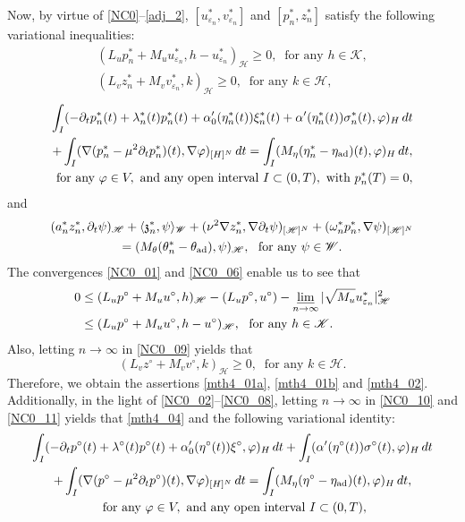 \documentclass{sinst}
\numberwithin{equation}{section}
\theoremstyle{plain}
\theoremstyle{definition}
\def\sH{\mathscr{H}}
\def\sK{\mathscr{K}}
\def\sW{\mathscr{W}}
\def\ad{{\rm ad}}
\begin{document}
Now, by virtue of \eqref{NC0}--\eqref{adj_2}, $[u_{\varepsilon_n}^*, v_{\varepsilon_n}^*]$ and $[p_n^*, z_n^*]$ satisfy the following variational inequalities:
\begin{gather}
  (L_u p_n^* + M_u u_{\varepsilon_n}^*, h - u_{\varepsilon_n}^*)_\sH \geq 0, \ \mbox{ for any } h \in \sK, \label{NC0_091}
  \\
  (L_v z_n^* + M_v v_{\varepsilon_n}^*, k)_\sH \geq 0, \ \mbox{ for any } k \in \sH, \label{NC0_09}
\end{gather}
\begin{gather}
  \int_I (-\partial_t p_n^*(t) + \lambda_n^*(t) p_n^*(t) + \alpha_0'(\eta_n^*(t)) \xi_n^*(t) + \alpha'(\eta_n^*(t)) \sigma_n^*(t), \varphi)_H \,dt
  \\
  + \int_I (\nabla (p_n^* - \mu^2 \partial_t p_n^*)(t), \nabla \varphi)_{[H]^N} \,dt = \int_I (M_\eta (\eta_n^* - \eta_\ad)(t), \varphi)_H \,dt, \label{NC0_10}
  \\
  \mbox{ for any } \varphi \in V, \mbox{ and any open interval } I \subset (0,T), \mbox{ with } p_n^*(T) = 0,
\end{gather}
and
\begin{gather}
  (a_n^* z_n^*, \partial_t \psi)_\sH + \langle \mathfrak{z}_n^*, \psi \rangle_\sW + (\nu^2 \nabla z_n^*, \nabla \partial_t \psi)_{[\sH]^N} + (\omega_n^* p_n^*, \nabla \psi)_{[\sH]^N}
  \\
  = (M_\theta(\theta_n^* - \theta_\ad), \psi)_\sH, \ \mbox{ for any } \psi \in \sW. \label{NC0_11}
\end{gather}
The convergences \eqref{NC0_01} and \eqref{NC0_06} enable us to see that
\begin{align}
  0 &\leq (L_u p^\circ + M_u u^\circ, h)_\sH - (L_u p^\circ, u^\circ) - \varliminf_{n \to \infty} |\sqrt{M_u} u_{\varepsilon_n}^*|_\sH^2
  \\
  &\leq (L_u p^\circ + M_u u^\circ, h - u^\circ)_\sH, \ \mbox{ for any } h \in \sK.
\end{align}
Also, letting $n \to \infty$ in \eqref{NC0_09} yields that
\begin{equation}
  (L_v z^\circ + M_v v^\circ, k)_\sH \geq 0, \ \mbox{ for any } k \in \sH.
\end{equation}
Therefore, we obtain the assertions \eqref{mth4_01a}, \eqref{mth4_01b} and \eqref{mth4_02}. Additionally, in the light of \eqref{NC0_02}--\eqref{NC0_08}, letting $n \to \infty$ in \eqref{NC0_10} and \eqref{NC0_11} yields that \eqref{mth4_04} and the following variational identity:
\begin{gather}
  \int_I (-\partial_t p^\circ(t) + \lambda^\circ(t) p^\circ(t) + \alpha_0'(\eta^\circ(t)) \xi^\circ, \varphi)_H \,dt + \int_I (\alpha'(\eta^\circ(t)) \sigma^\circ(t), \varphi)_H \,dt\label{NC0_12}
  \\
  + \int_I (\nabla (p^\circ - \mu^2 \partial_t p^\circ)(t), \nabla \varphi)_{[H]^N} \,dt= \int_I (M_\eta (\eta^\circ - \eta_\ad)(t), \varphi)_H \,dt,
  \\
  \mbox{ for any } \varphi \in V, \mbox{ and any open interval } I \subset (0,T),
\end{gather}
\end{document}
